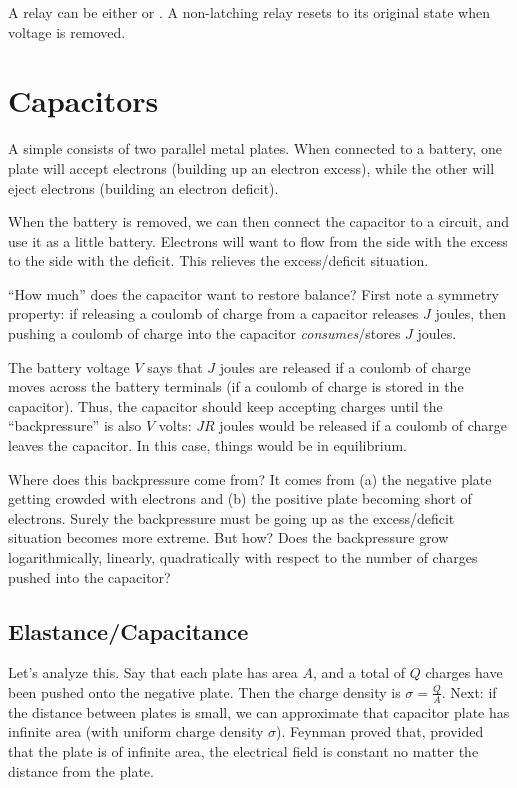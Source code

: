 \documentclass[11pt, oneside]{amsart}
\begin{document}
A relay can be either  or . A
non-latching relay resets to its original state when voltage is removed.

\section{Capacitors}

A simple  consists of two parallel metal plates. When
connected to a battery, one plate will accept electrons (building up an
electron excess), while the other will eject electrons (building an
electron deficit).

When the battery is removed, we can then connect the capacitor to a
circuit, and use it as a little battery. Electrons will want to flow
from the side with the excess to the side with the deficit. This
relieves the excess/deficit situation.

``How much'' does the capacitor want to restore balance? First note a
symmetry property: if releasing a coulomb of charge from a capacitor
releases $J$ joules, then pushing a coulomb of charge into the capacitor
\emph{consumes}/stores $J$ joules.

The battery voltage $V$ says that $J$ joules are released if a coulomb
of charge moves across the battery terminals (if a coulomb of charge is
stored in the capacitor). Thus, the capacitor should keep accepting
charges until the ``backpressure'' is also $V$ volts: $JR$ joules would
be released if a coulomb of charge leaves the capacitor. In this case,
things would be in equilibrium.

Where does this backpressure come from? It comes from (a) the negative
plate getting crowded with electrons and (b) the positive plate becoming
short of electrons. Surely the backpressure must be going up as the
excess/deficit situation becomes more extreme. But how? Does the
backpressure grow logarithmically, linearly, quadratically with respect
to the number of charges pushed into the capacitor?

\subsection{Elastance/Capacitance}

Let's analyze this. Say that each plate has area $A$, and a total of $Q$
charges have been pushed onto the negative plate. Then the charge
density is $\sigma = \frac{Q}{A}$. Next: if the distance between plates
is small, we can approximate that capacitor plate has infinite area
(with uniform charge density $\sigma$). Feynman proved that, provided
that the plate is of infinite area, the electrical field is constant no
matter the distance from the plate.
\end{document}
